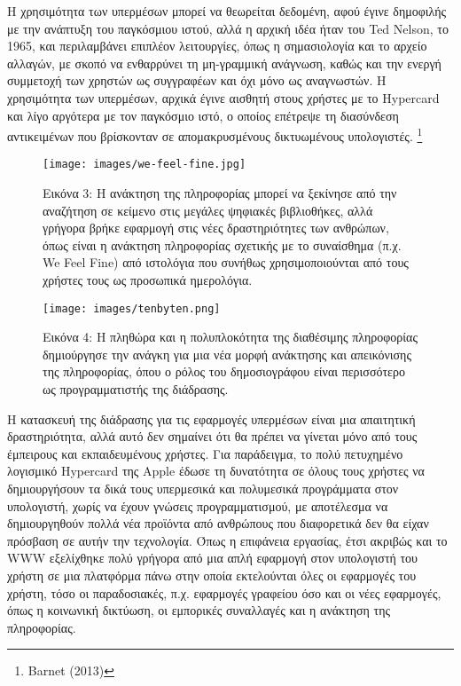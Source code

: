 \documentclass[
]{article}
\begin{document}
Η χρησιμότητα των υπερμέσων μπορεί να θεωρείται δεδομένη, αφού έγινε
δημοφιλής με την ανάπτυξη του παγκόσμιου ιστού, αλλά η αρχική ιδέα ήταν
του Ted Nelson, το 1965, και περιλαμβάνει επιπλέον λειτουργίες, όπως η
σημασιολογία και το αρχείο αλλαγών, με σκοπό να ενθαρρύνει τη
μη-γραμμική ανάγνωση, καθώς και την ενεργή συμμετοχή των χρηστών ως
συγγραφέων και όχι μόνο ως αναγνωστών. Η χρησιμότητα των υπερμέσων,
αρχικά έγινε αισθητή στους χρήστες με το Hypercard και λίγο αργότερα με
τον παγκόσμιο ιστό, ο οποίος επέτρεψε τη διασύνδεση αντικειμένων που
βρίσκονταν σε απομακρυσμένους δικτυωμένους υπολογιστές. \footnote{Barnet
  (2013)}

\leavevmode{}%
\begin{figure}
\hypertarget{fig:we-feel-fine}{%
\centering
\texttt{[image: images/we-feel-fine.jpg]}
\caption{Εικόνα 3: Η ανάκτηση της πληροφορίας μπορεί να ξεκίνησε από την
αναζήτηση σε κείμενο στις μεγάλες ψηφιακές βιβλιοθήκες, αλλά γρήγορα
βρήκε εφαρμογή στις νέες δραστηριότητες των ανθρώπων, όπως είναι η
ανάκτηση πληροφορίας σχετικής με το συναίσθημα (π.χ. We Feel Fine) από
ιστολόγια που συνήθως χρησιμοποιούνται από τους χρήστες τους ως
προσωπικά ημερολόγια.}\label{fig:we-feel-fine}
}
\end{figure}

\leavevmode{}%
\begin{figure}
\hypertarget{fig:tenbyten}{%
\centering
\texttt{[image: images/tenbyten.png]}
\caption{Εικόνα 4: Η πληθώρα και η πολυπλοκότητα της διαθέσιμης
πληροφορίας δημιούργησε την ανάγκη για μια νέα μορφή ανάκτησης και
απεικόνισης της πληροφορίας, όπου ο ρόλος του δημοσιογράφου είναι
περισσότερο ως προγραμματιστής της διάδρασης.}\label{fig:tenbyten}
}
\end{figure}

Η κατασκευή της διάδρασης για τις εφαρμογές υπερμέσων είναι μια
απαιτητική δραστηριότητα, αλλά αυτό δεν σημαίνει ότι θα πρέπει να
γίνεται μόνο από τους έμπειρους και εκπαιδευμένους χρήστες. Για
παράδειγμα, το πολύ πετυχημένο λογισμικό Hypercard της Apple έδωσε τη
δυνατότητα σε όλους τους χρήστες να δημιουργήσουν τα δικά τους
υπερμεσικά και πολυμεσικά προγράμματα στον υπολογιστή, χωρίς να έχουν
γνώσεις προγραμματισμού, με αποτέλεσμα να δημιουργηθούν πολλά νέα
προϊόντα από ανθρώπους που διαφορετικά δεν θα είχαν πρόσβαση σε αυτήν
την τεχνολογία. Όπως η επιφάνεια εργασίας, έτσι ακριβώς και το WWW
εξελίχθηκε πολύ γρήγορα από μια απλή εφαρμογή στον υπολογιστή του χρήστη
σε μια πλατφόρμα πάνω στην οποία εκτελούνται όλες οι εφαρμογές του
χρήστη, τόσο οι παραδοσιακές, π.χ. εφαρμογές γραφείου όσο και οι νέες
εφαρμογές, όπως η κοινωνική δικτύωση, οι εμπορικές συναλλαγές και η
ανάκτηση της πληροφορίας.
\end{document}
